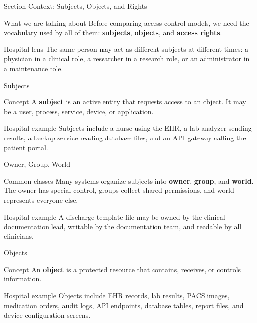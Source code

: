 \documentclass[presentation]{beamer}
\begin{document}
\begin{frame}[c]{Section Context: Subjects, Objects, and Rights}
\begin{block}{What we are talking about}
Before comparing access-control models, we need the vocabulary used by all of them:
\textbf{subjects}, \textbf{objects}, and \textbf{access rights}.
\end{block}

\begin{exampleblock}{Hospital lens}
The same person may act as different subjects at different times: a physician in a clinical role, a
researcher in a research role, or an administrator in a maintenance role.
\end{exampleblock}
\end{frame}

\begin{frame}[c]{Subjects}
\begin{block}{Concept}
A \textbf{subject} is an active entity that requests access to an object. It may be a user, process,
service, device, or application.
\end{block}

\begin{exampleblock}{Hospital example}
Subjects include a nurse using the EHR, a lab analyzer sending results, a backup service reading
database files, and an API gateway calling the patient portal.
\end{exampleblock}
\end{frame}

\begin{frame}[c]{Owner, Group, World}
\begin{block}{Common classes}
Many systems organize subjects into \textbf{owner}, \textbf{group}, and \textbf{world}. The owner
has special control, groups collect shared permissions, and world represents everyone else.
\end{block}

\begin{exampleblock}{Hospital example}
A discharge-template file may be owned by the clinical documentation lead, writable by the
documentation team, and readable by all clinicians.
\end{exampleblock}
\end{frame}

\begin{frame}[c]{Objects}
\begin{block}{Concept}
An \textbf{object} is a protected resource that contains, receives, or controls information.
\end{block}

\begin{exampleblock}{Hospital example}
Objects include EHR records, lab results, PACS images, medication orders, audit logs, API
endpoints, database tables, report files, and device configuration screens.
\end{exampleblock}
\end{frame}
\end{document}

